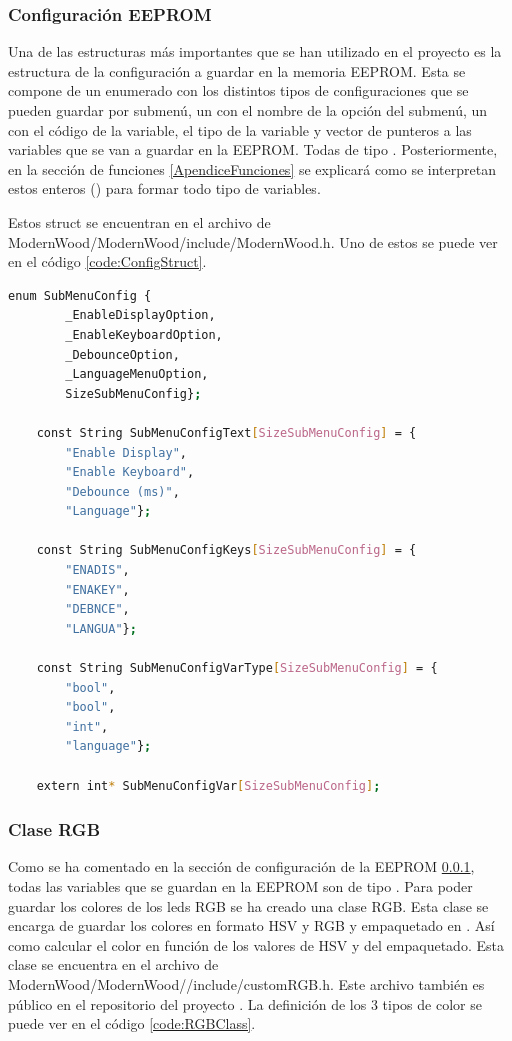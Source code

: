 \subsubsection{Configuración EEPROM} \label{ApendiceConfigEEPROM}
Una de las estructuras más importantes que se han utilizado en el proyecto es la estructura de la configuración a guardar en la memoria \gls{EEPROM}. Esta se compone de un enumerado con los distintos tipos de configuraciones que se pueden guardar por submenú, un  con el nombre de la opción del submenú, un  con el código de la variable, el tipo de la variable y vector de punteros a las variables que se van a guardar en la \gls{EEPROM}. Todas de tipo . Posteriormente, en la sección de funciones \ref{ApendiceFunciones} se explicará como se interpretan estos enteros () para formar todo tipo de variables.

Estos struct se encuentran en el archivo de ModernWood/ModernWood/include/ModernWood.h. Uno de estos se puede ver en el código \ref{code:ConfigStruct}.

\begin{lstlisting}[style=console, language=bash, caption={Primer Struct de configuración del teclado}, label={code:ConfigStruct}]
    enum SubMenuConfig {
        _EnableDisplayOption, 
        _EnableKeyboardOption, 
        _DebounceOption, 
        _LanguageMenuOption,
        SizeSubMenuConfig};

    const String SubMenuConfigText[SizeSubMenuConfig] = {
        "Enable Display", 
        "Enable Keyboard", 
        "Debounce (ms)", 
        "Language"};

    const String SubMenuConfigKeys[SizeSubMenuConfig] = {
        "ENADIS", 
        "ENAKEY", 
        "DEBNCE", 
        "LANGUA"};

    const String SubMenuConfigVarType[SizeSubMenuConfig] = {
        "bool", 
        "bool", 
        "int", 
        "language"};

    extern int* SubMenuConfigVar[SizeSubMenuConfig];
\end{lstlisting}

\subsubsection{Clase RGB} \label{ApendiceClaseRGB}
Como se ha comentado en la sección de configuración de la \gls{EEPROM} \ref{ApendiceConfigEEPROM}, todas las variables que se guardan en la \gls{EEPROM} son de tipo . Para poder guardar los colores de los leds RGB se ha creado una clase RGB. Esta clase se encarga de guardar los colores en formato HSV y RGB y empaquetado en . Así como calcular el color en función de los valores de HSV y del empaquetado. Esta clase se encuentra en el archivo de ModernWood/ModernWood//include/customRGB.h. Este archivo también es público en el repositorio del proyecto \cite{ModernWoodGitHub}. La definición de los 3 tipos de color se puede ver en el código \ref{code:RGBClass}.

